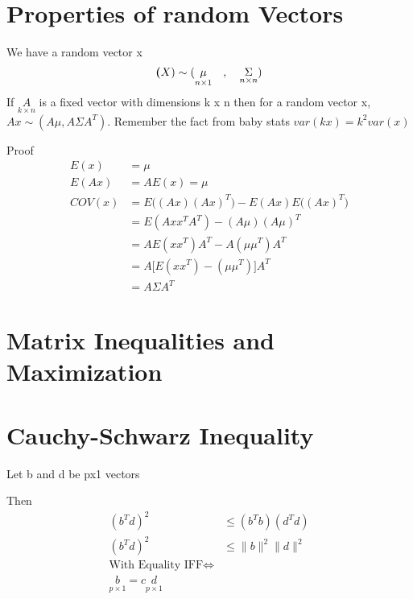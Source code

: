 \section{Properties of random Vectors}
We have a random vector x
\[\textbf(X) \sim (\underset{n \times 1}{\mu} \quad,\quad\underset{n \times n}{\Sigma})\]
If $\underset{k \times n}{A}$ is a fixed vector with dimensions k x n then for a random vector x, $Ax \sim (A\mu,A\Sigma A^T)$. Remember the fact from baby stats $var(kx)=k^2var(x)$

Proof 
\begin{align*}
    E(x) &= \mu \\
    E(Ax) &= AE(x) = \mu \\
    COV(x) &= E\big( (Ax)(Ax)^T \big)-E(Ax) E\big((Ax)^T \big) \\
    &=  E(Axx^TA^T)-(A\mu)(A\mu)^T\\
    &= AE(xx^T)A^T - A(\mu\mu^T)A^T\\
    &= A \big[E(xx^T) - (\mu\mu^T)\big]A^T\\
    &= A\Sigma A^T
\end{align*}

\section{Matrix Inequalities and Maximization}

\section{Cauchy-Schwarz Inequality}
Let b and d be px1 vectors

Then
\begin{align*}
(b^Td)^2 &\leq (b^Tb)(d^Td)\\(b^Td)^2 &\leq \| b\|^2\| d\|^2 \\ \text{With Equality IFF} \Leftrightarrow\\ \underset{p \times 1}{b} = c\underset{p \times 1}{d}
\end{align*}
